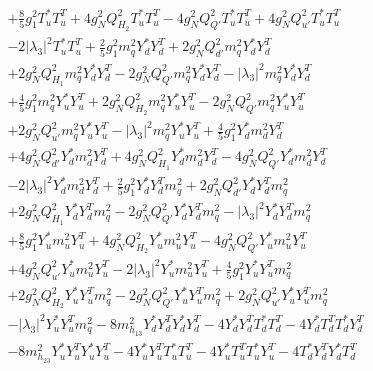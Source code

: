 {\begin{align}
 &+\frac{8}{5} g_{1}^{2} {T_u^*  T_{u}^{T}} +4 g_{N}^{2} Q_{H_2}^{2} {T_u^*  T_{u}^{T}} -4 g_{N}^{2} Q_{Q'}^{2} {T_u^*  T_{u}^{T}} +4 g_{N}^{2} Q_{u'}^{2} {T_u^*  T_{u}^{T}} \nonumber \\ 
 &-2 |\lambda_3|^2 {T_u^*  T_{u}^{T}} +\frac{2}{5} g_{1}^{2} {m_q^2  Y_d^*  Y_{d}^{T}} +2 g_{N}^{2} Q_{d'}^{2} {m_q^2  Y_d^*  Y_{d}^{T}} \nonumber \\ 
 &+2 g_{N}^{2} Q_{H_1}^{2} {m_q^2  Y_d^*  Y_{d}^{T}} -2 g_{N}^{2} Q_{Q'}^{2} {m_q^2  Y_d^*  Y_{d}^{T}} - |\lambda_3|^2 {m_q^2  Y_d^*  Y_{d}^{T}} \nonumber \\ 
 &+\frac{4}{5} g_{1}^{2} {m_q^2  Y_u^*  Y_{u}^{T}} +2 g_{N}^{2} Q_{H_2}^{2} {m_q^2  Y_u^*  Y_{u}^{T}} -2 g_{N}^{2} Q_{Q'}^{2} {m_q^2  Y_u^*  Y_{u}^{T}} \nonumber \\ 
 &+2 g_{N}^{2} Q_{u'}^{2} {m_q^2  Y_u^*  Y_{u}^{T}} - |\lambda_3|^2 {m_q^2  Y_u^*  Y_{u}^{T}} +\frac{4}{5} g_{1}^{2} {Y_d^*  m_d^2  Y_{d}^{T}} \nonumber \\ 
 &+4 g_{N}^{2} Q_{d'}^{2} {Y_d^*  m_d^2  Y_{d}^{T}} +4 g_{N}^{2} Q_{H_1}^{2} {Y_d^*  m_d^2  Y_{d}^{T}} -4 g_{N}^{2} Q_{Q'}^{2} {Y_d^*  m_d^2  Y_{d}^{T}} \nonumber \\ 
 &-2 |\lambda_3|^2 {Y_d^*  m_d^2  Y_{d}^{T}} +\frac{2}{5} g_{1}^{2} {Y_d^*  Y_{d}^{T}  m_q^2} +2 g_{N}^{2} Q_{d'}^{2} {Y_d^*  Y_{d}^{T}  m_q^2} \nonumber \\ 
 &+2 g_{N}^{2} Q_{H_1}^{2} {Y_d^*  Y_{d}^{T}  m_q^2} -2 g_{N}^{2} Q_{Q'}^{2} {Y_d^*  Y_{d}^{T}  m_q^2} - |\lambda_3|^2 {Y_d^*  Y_{d}^{T}  m_q^2} \nonumber \\ 
 &+\frac{8}{5} g_{1}^{2} {Y_u^*  m_u^2  Y_{u}^{T}} +4 g_{N}^{2} Q_{H_2}^{2} {Y_u^*  m_u^2  Y_{u}^{T}} -4 g_{N}^{2} Q_{Q'}^{2} {Y_u^*  m_u^2  Y_{u}^{T}} \nonumber \\ 
 &+4 g_{N}^{2} Q_{u'}^{2} {Y_u^*  m_u^2  Y_{u}^{T}} -2 |\lambda_3|^2 {Y_u^*  m_u^2  Y_{u}^{T}} +\frac{4}{5} g_{1}^{2} {Y_u^*  Y_{u}^{T}  m_q^2} \nonumber \\ 
 &+2 g_{N}^{2} Q_{H_2}^{2} {Y_u^*  Y_{u}^{T}  m_q^2} -2 g_{N}^{2} Q_{Q'}^{2} {Y_u^*  Y_{u}^{T}  m_q^2} +2 g_{N}^{2} Q_{u'}^{2} {Y_u^*  Y_{u}^{T}  m_q^2} \nonumber \\ 
 &- |\lambda_3|^2 {Y_u^*  Y_{u}^{T}  m_q^2} -8 m_{h_{13}}^2 {Y_d^*  Y_{d}^{T}  Y_d^*  Y_{d}^{T}} -4 {Y_d^*  Y_{d}^{T}  T_d^*  T_{d}^{T}} -4 {Y_d^*  T_{d}^{T}  T_d^*  Y_{d}^{T}} \nonumber \\ 
 &-8 m_{h_{23}}^2 {Y_u^*  Y_{u}^{T}  Y_u^*  Y_{u}^{T}} -4 {Y_u^*  Y_{u}^{T}  T_u^*  T_{u}^{T}} -4 {Y_u^*  T_{u}^{T}  T_u^*  Y_{u}^{T}} -4 {T_d^*  Y_{d}^{T}  Y_d^*  T_{d}^{T}} \nonumber \\ 

\end{align}}
